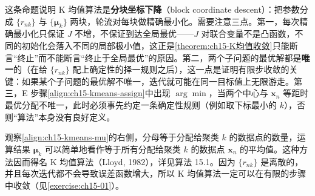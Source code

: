 \documentclass[../../main.tex]{subfiles}
\begin{document}
\begin{remark}
这条命题说明 K 均值算法是\textbf{分块坐标下降}（block coordinate descent）：把参数分成 $\{r_{nk}\}$ 与 $\{\bm{\mu}_k\}$ 两块，轮流对每块做精确最小化。需要注意三点。第一，每次精确最小化只保证 $J$ 不增，不保证到达全局最优——$J$ 对联合变量不是凸函数，不同的初始化会落入不同的局部极小值，这正是\cref{theorem:ch15-K均值收敛}只能断言“终止”而不能断言“终止于全局最优”的原因。第二，两个子问题的最优解都是\textbf{唯一}的（在给 $\{r_{nk}\}$ 配上确定性的择一规则之后），这一点是证明有限步收敛的关键：如果某个子问题的最优解不唯一，迭代就可能在同一目标值上无限游走。第三，E 步骤\eqref{align:ch15-kmeans-assign}中出现 $\arg\min$，当两个中心与 $\bm{x}_n$ 等距时最优分配不唯一，此时必须事先约定一条确定性规则（例如取下标最小的 $k$），否则“算法”本身没有良好定义。
\end{remark}

观察\eqref{align:ch15-kmeans-mu}的右侧，分母等于分配给聚类 $k$ 的数据点的数量，运算结果 $\bm{\mu}_k$ 可以简单地看作等于所有分配给聚类 $k$ 的数据点 $\bm{x}_n$ 的平均值。这种方法因而得名 K 均值算法（Lloyd, 1982），详见算法 15.1。因为 $\{r_{nk}\}$ 是离散的，并且每次迭代都不会导致误差函数增大，所以 K 均值算法一定可以在有限的步骤中收敛（见\cref{exercise:ch15-01}）。
\end{document}
